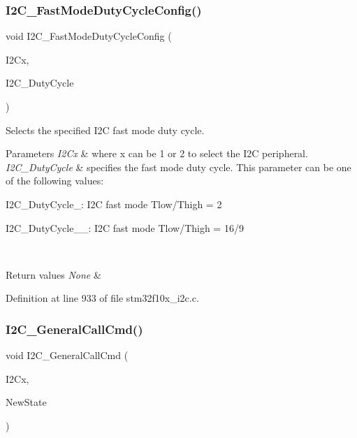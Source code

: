 \subsubsection{\texorpdfstring{I2\+C\+\_\+\+Fast\+Mode\+Duty\+Cycle\+Config()}{I2C\_FastModeDutyCycleConfig()}}
{\footnotesize\ttfamily void I2\+C\+\_\+\+Fast\+Mode\+Duty\+Cycle\+Config (\begin{DoxyParamCaption}\item[{\hyperlink{struct_i2_c___type_def}{I2\+C\+\_\+\+Type\+Def} $\ast$}]{I2\+Cx,  }\item[{uint16\+\_\+t}]{I2\+C\+\_\+\+Duty\+Cycle }\end{DoxyParamCaption})}



Selects the specified I2C fast mode duty cycle. 


\begin{DoxyParams}{Parameters}
{\em I2\+Cx} & where x can be 1 or 2 to select the I2C peripheral. \\
\hline
{\em I2\+C\+\_\+\+Duty\+Cycle} & specifies the fast mode duty cycle. This parameter can be one of the following values\+: \begin{DoxyItemize}
\item I2\+C\+\_\+\+Duty\+Cycle\+\_\+: I2C fast mode Tlow/\+Thigh = 2 \item I2\+C\+\_\+\+Duty\+Cycle\+\_\+\_\+: I2C fast mode Tlow/\+Thigh = 16/9 \end{DoxyItemize}
\\
\hline
\end{DoxyParams}

\begin{DoxyRetVals}{Return values}
{\em None} & \\
\hline
\end{DoxyRetVals}


Definition at line 933 of file stm32f10x\+\_\+i2c.\+c.

\mbox{\label{group___i2_c___private___functions_ga65c740fc8d7b3b9f15cc432d8699d471}} 
\subsubsection{\texorpdfstring{I2\+C\+\_\+\+General\+Call\+Cmd()}{I2C\_GeneralCallCmd()}}
{\footnotesize\ttfamily void I2\+C\+\_\+\+General\+Call\+Cmd (\begin{DoxyParamCaption}\item[{\hyperlink{struct_i2_c___type_def}{I2\+C\+\_\+\+Type\+Def} $\ast$}]{I2\+Cx,  }\item[{\hyperlink{group___exported__types_gac9a7e9a35d2513ec15c3b537aaa4fba1}{Functional\+State}}]{New\+State }\end{DoxyParamCaption})}



